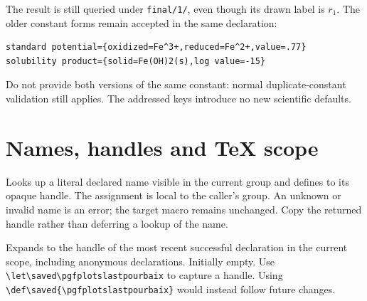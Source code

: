 \documentclass[a4paper,11pt]{ltxdoc}
\begin{document}
\begin{codeexample}[width=8cm]
\end{codeexample}
The result is still queried under \texttt{final/1/}, even though its drawn label
is $r_1$. The older constant forms remain accepted in the same declaration:
\begin{verbatim}
standard potential={oxidized=Fe^3+,reduced=Fe^2+,value=.77}
solubility product={solid=Fe(OH)2(s),log value=-15}
\end{verbatim}
Do not provide both versions of the same constant: normal duplicate-constant
validation still applies. The addressed keys introduce no new scientific defaults.

\section{Names, handles and TeX scope}
\begin{command}{\pgfplotsgetpourbaix{}}
Looks up a literal declared name visible in the current group and defines
 to its opaque handle. The assignment is local to the caller's group.
An unknown or invalid name is an error; the target macro remains unchanged.
Copy the returned handle rather than deferring a lookup of the name.
\end{command}
\begin{command}{\pgfplotslastpourbaix}
Expands to the handle of the most recent successful declaration in the current
scope, including anonymous declarations. Initially empty. Use
\verb|\let\saved\pgfplotslastpourbaix| to capture a handle. Using
\verb|\def\saved{\pgfplotslastpourbaix}| would instead follow future changes.
\end{command}
\end{document}

